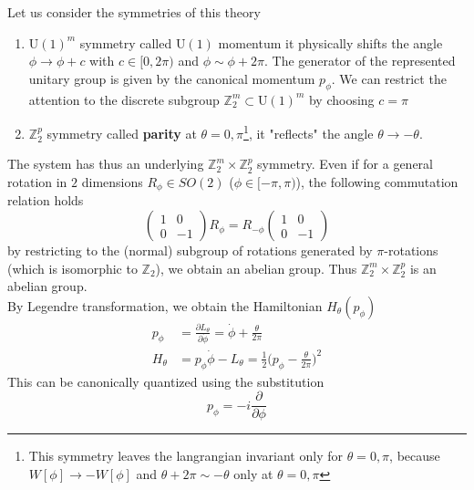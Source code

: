 \documentclass[11pt]{article}
\theoremstyle{definition}
\numberwithin{equation}{section}
\newcommand*\U{\mathrm{U}}
\begin{document}
Let us consider the symmetries of this theory
\begin{enumerate}
    \item $\U(1)^m$ symmetry called $\U(1)$ momentum it physically shifts the angle $\phi \to \phi +c$   with $c \in [0, 2 \pi)$ and $\phi \sim \phi + 2 \pi$. The generator of the represented unitary group is given by the canonical momentum $p_{\phi}$. We can restrict the attention to the discrete subgroup $\mathbb{Z}_2^m \subset \U(1)^m$ by choosing $c= \pi$
	\item $\mathbb{Z}_2^p$ symmetry called \textbf{parity} at $\theta=0, \pi$\footnote{This symmetry leaves the langrangian invariant only for $\theta=0, \pi$, because $W[\phi] \to -W[\phi]$ and $\theta + 2 \pi \sim - \theta$ only at $\theta =0, \pi$}, it "reflects" the angle $ \theta \to - \theta$. 
\end{enumerate}
The system has thus an underlying $\mathbb{Z}_2^m \times \mathbb{Z}_2^p$ symmetry. Even if for a general rotation in $2$ dimensions $R_{\phi} \in SO(2)$ ($\phi \in [-\pi, \pi)$), the following commutation relation holds
\begin{equation}
    \begin{pmatrix}
1 &0\\
0 &-1
    \end{pmatrix} R_{\phi} = R_{-\phi} \begin{pmatrix}
1 &0\\
0 &-1
    \end{pmatrix}
\end{equation}
by restricting to the (normal) subgroup of rotations generated by $\pi$-rotations (which is isomorphic to $\mathbb{Z}_2$), we obtain an abelian group. Thus $\mathbb{Z}_2^m \times \mathbb{Z}_2^p$ is an abelian group.\\
By Legendre transformation, we obtain the Hamiltonian $H_{\theta}(p_{\phi})$
\begin{equation}
     \begin{aligned}
 p_{\phi} &= \frac{\partial L_{\theta}}{\partial \Dot{\phi}} = \dot{\phi} + \frac{\theta}{2 \pi}\\
 H_{\theta} &= p_{\phi} \dot{\phi} -L_{\theta} = \frac{1}{2} \bigg( p_{\phi} - \frac{\theta}{2 \pi} \bigg)^2
     \end{aligned}
\end{equation}
This can be canonically quantized using the substitution
\begin{equation}
     p_{\phi} = - i \frac{\partial}{\partial \phi}
\end{equation}
\end{document}

